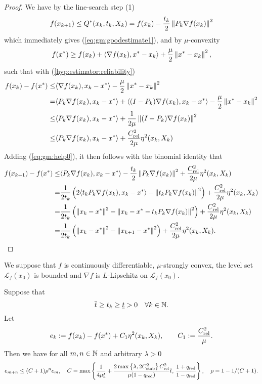 \begin{proof}
We have by the line-search step (1) 
%
%
\begin{equation}\label{eq:gm:help0}
f(x_{k+1}) \le Q^*(x_k, t_k, X_{k})  = f(x_k) - \frac{t_k}{2}\left\|P_{k}\nabla f(x_k)\right\|^2 
\end{equation}
%
%
which immediately gives (\ref{eq:gm:goodestimate1}), and by $\mu$-convexity
%
\begin{align*}
f(x^*) \ge f(x_k) +  \langle\nabla f(x_k),x^*-x_k\rangle +\frac{\mu}{2}\left\|x^*-x_k\right\|^2, 
\end{align*}
%
such that with (\ref{hyp:estimator:reliability})
%
\begin{align*}
f(x_k) - f(x^*) \le& \langle\nabla f(x_k),x_k-x^*\rangle -\frac{\mu}{2}\left\|x^*-x_k\right\|^2\\
=& \langle P_k\nabla f(x_k),x_k-x^*\rangle +\langle(I-P_k)\nabla f(x_k),x_k-x^*\rangle -\frac{\mu}{2}\left\|x^*-x_k\right\|^2\\
\le& \langle P_k\nabla f(x_k),x_k-x^*\rangle +\frac{1}{2\mu}\left\|(I-P_k)\nabla f(x_k)\right\|^2\\
\le& \langle P_k\nabla f(x_k),x_k-x^*\rangle +\frac{C_{\rm rel}^2}{2\mu}\eta^2(x_k,X_k)
\end{align*}
%
Adding (\ref{eq:gm:help0}), it then follows with the binomial identity that
%
\begin{align*}
f(x_{k+1}) - f(x^*) \le& \langle P_{k}\nabla f(x_k),x_k-x^*\rangle - \frac{t_k}{2}\left\|P_{k}\nabla f(x_k)\right\|^2 +\frac{C_{\rm rel}^2}{2\mu}\eta^2(x_k,X_k)\\
=& \frac{1}{2 t_k}\left(2\langle t_kP_{k}\nabla f(x_k),x_k-x^*\rangle - \left\|t_kP_{k}\nabla f(x_k)\right\|^2\right) +\frac{C_{\rm rel}^2}{2\mu}\eta^2(x_k,X_k)\\
=& \frac{1}{2 t_k}\left(\left\|x_k-x^*\right\|^2 - \left\|x_k-x^*-t_kP_{k}\nabla f(x_k)\right\|^2\right) +\frac{C_{\rm rel}^2}{2\mu}\eta^2(x_k,X_k)\\
=& \frac{1}{2 t_k}\left(\left\|x_k-x^*\right\|^2 - \left\|x_{k+1}-x^*\right\|^2\right) +\frac{C_{\rm rel}^2}{2\mu}\eta^2(x_k,X_k).
\end{align*}
%
%
%
\end{proof}
%
\begin{theorem}\label{thm:}
We suppose that $f$ is continuously differentiable, $\mu$-strongly convex,
the level set $\mathcal L_f(x_0)$ is bounded and $\nabla f$ is $L$-Lipschitz on $\mathcal L_f(x_0)$.

Suppose that
%
\begin{equation}\label{eq:timestepcond}
\overline{t}\ge t_k \ge \underline{t}>0\quad\forall k\in\mathbb N.
\end{equation}
%
Let
%
\begin{equation}\label{eq:gm:errordef}
e_k := f(x_{k}) - f(x^*) + C_1 \eta^2(x_{k}, X_k),\qquad C_1 := \frac{C_{\rm rel}^2}{\mu}.
\end{equation}
%
Then we have for all $m,n\in\mathbb N$ and arbitrary $\lambda>0$
%
\begin{equation}\label{eq:gm:rconv}
e_{m+n} \le (C+1) \rho^n e_m,\quad C=\max\left\{\frac{1}{4\mu\underline{t}} +  \frac{2\max\left\{\lambda,2C_{\rm stab}^2\right\}C_{\rm rel}^2}{\mu(1-{q_{\rm red}})} \overline{t},\,\frac{1+q_{\rm red}}{1-q_{\rm red}}\right\},
\quad \rho = 1 - 1/(C+1).
\end{equation}
%
\end{theorem}
